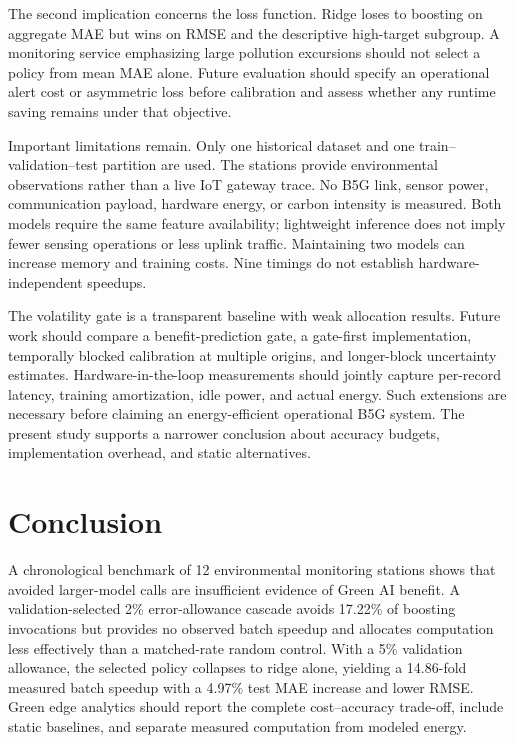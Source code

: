 \documentclass[conference,a4paper]{IEEEtran}
\begin{document}
The second implication concerns the loss function. Ridge loses to boosting on aggregate MAE but wins on RMSE and the descriptive high-target subgroup. A monitoring service emphasizing large pollution excursions should not select a policy from mean MAE alone. Future evaluation should specify an operational alert cost or asymmetric loss before calibration and assess whether any runtime saving remains under that objective.

Important limitations remain. Only one historical dataset and one train--validation--test partition are used. The stations provide environmental observations rather than a live IoT gateway trace. No B5G link, sensor power, communication payload, hardware energy, or carbon intensity is measured. Both models require the same feature availability; lightweight inference does not imply fewer sensing operations or less uplink traffic. Maintaining two models can increase memory and training costs. Nine timings do not establish hardware-independent speedups.

The volatility gate is a transparent baseline with weak allocation results. Future work should compare a benefit-prediction gate, a gate-first implementation, temporally blocked calibration at multiple origins, and longer-block uncertainty estimates. Hardware-in-the-loop measurements should jointly capture per-record latency, training amortization, idle power, and actual energy. Such extensions are necessary before claiming an energy-efficient operational B5G system. The present study supports a narrower conclusion about accuracy budgets, implementation overhead, and static alternatives.

\section{Conclusion}
A chronological benchmark of 12 environmental monitoring stations shows that avoided larger-model calls are insufficient evidence of Green AI benefit. A validation-selected 2\% error-allowance cascade avoids 17.22\% of boosting invocations but provides no observed batch speedup and allocates computation less effectively than a matched-rate random control. With a 5\% validation allowance, the selected policy collapses to ridge alone, yielding a 14.86-fold measured batch speedup with a 4.97\% test MAE increase and lower RMSE. Green edge analytics should report the complete cost--accuracy trade-off, include static baselines, and separate measured computation from modeled energy.
\end{document}
